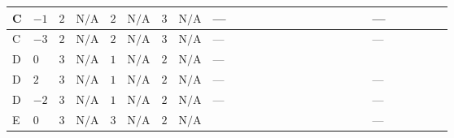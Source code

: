 \documentclass[8pt]{article}
\begin{document}
\begin{landscape}
\begin{longtable}{@{}llcccccc >{\raggedright\arraybackslash}p{0.21\linewidth} >{\raggedright\arraybackslash}p{0.21\linewidth} >{\raggedright\arraybackslash}p{0.21\linewidth}@{}}
\midrule
C & $-1$ & $2$ & $\text{N/A}$ & $2$ & $\text{N/A}$ & $3$ & $\text{N/A}$ & --- & \scriptsize\adjustbox{max width=\linewidth}{$\begin{gathered} +6 {\lambda_5} \left({\lambda_5}\right)^{*}\end{gathered}$} & --- \\
\midrule
C & $-3$ & $2$ & $\text{N/A}$ & $2$ & $\text{N/A}$ & $3$ & $\text{N/A}$ & --- & \scriptsize\adjustbox{max width=\linewidth}{$\begin{gathered} +6 {\lambda_5} \left({\lambda_5}\right)^{*}\end{gathered}$} & --- \\
\midrule
D & $0$ & $3$ & $\text{N/A}$ & $1$ & $\text{N/A}$ & $2$ & $\text{N/A}$ & --- & \scriptsize\adjustbox{max width=\linewidth}{$\begin{gathered} +12 {\lambda_5} \left({\lambda_5}\right)^{*}\end{gathered}$} & \scriptsize\adjustbox{max width=\linewidth}{$\begin{gathered} +12 {\lambda_{X_{18}}} \left({\lambda_{X_{5}}^{(1)}}\right)^{*}\end{gathered}$} \\
\midrule
D & $2$ & $3$ & $\text{N/A}$ & $1$ & $\text{N/A}$ & $2$ & $\text{N/A}$ & --- & \scriptsize\adjustbox{max width=\linewidth}{$\begin{gathered} +12 {\lambda_5} \left({\lambda_5}\right)^{*}\end{gathered}$} & --- \\
\midrule
D & $-2$ & $3$ & $\text{N/A}$ & $1$ & $\text{N/A}$ & $2$ & $\text{N/A}$ & --- & \scriptsize\adjustbox{max width=\linewidth}{$\begin{gathered} +12 {\lambda_5} \left({\lambda_5}\right)^{*}\end{gathered}$} & --- \\
\midrule
E & $0$ & $3$ & $\text{N/A}$ & $3$ & $\text{N/A}$ & $2$ & $\text{N/A}$ & \scriptsize\adjustbox{max width=\linewidth}{$\begin{gathered} {\lambda_{HS_2}^{(1)}} (6 \operatorname{Tr}\!\left({Y_d}\,\left({Y_d}\right)^{\dagger}\right)+2 \operatorname{Tr}\!\left({Y_e}\,\left({Y_e}\right)^{\dagger}\right)+6 \operatorname{Tr}\!\left({Y_u}\,\left({Y_u}\right)^{\dagger}\right)+4 {\lambda_{S_2}^{(A)}})\end{gathered}$} & \scriptsize\adjustbox{max width=\linewidth}{$\begin{gathered} +4 {\lambda_5} \left({\lambda_5}\right)^{*}\end{gathered}$} & --- \\

\end{longtable}
\end{landscape}
\end{document}

